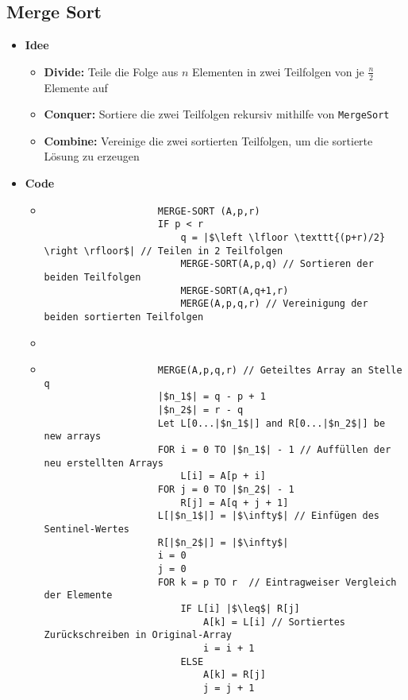 \subsection{Merge Sort} 
    \begin{itemize}
        \item \textbf{Idee} 
            \begin{itemize}
                \item \textbf{Divide:} Teile die Folge aus $n$ Elementen in zwei Teilfolgen von je $\frac{n}{2}$ Elemente auf
                \item \textbf{Conquer:} Sortiere die zwei Teilfolgen rekursiv mithilfe von \texttt{MergeSort}
                \item \textbf{Combine:} Vereinige die zwei sortierten Teilfolgen, um die sortierte Lösung zu erzeugen
            \end{itemize}
        \item \textbf{Code} 
            \begin{itemize}
                \item[]
                    \begin{verbatim}
                    MERGE-SORT (A,p,r)
                    IF p < r
                        q = |$\left \lfloor \texttt{(p+r)/2} \right \rfloor$| // Teilen in 2 Teilfolgen 
                        MERGE-SORT(A,p,q) // Sortieren der beiden Teilfolgen
                        MERGE-SORT(A,q+1,r)
                        MERGE(A,p,q,r) // Vereinigung der beiden sortierten Teilfolgen
                    \end{verbatim}
                \item[]
                \item[]
                    \begin{verbatim}
                    MERGE(A,p,q,r) // Geteiltes Array an Stelle q
                    |$n_1$| = q - p + 1
                    |$n_2$| = r - q 
                    Let L[0...|$n_1$|] and R[0...|$n_2$|] be new arrays 
                    FOR i = 0 TO |$n_1$| - 1 // Auffüllen der neu erstellten Arrays
                        L[i] = A[p + i]
                    FOR j = 0 TO |$n_2$| - 1
                        R[j] = A[q + j + 1]
                    L[|$n_1$|] = |$\infty$| // Einfügen des Sentinel-Wertes
                    R[|$n_2$|] = |$\infty$|
                    i = 0
                    j = 0
                    FOR k = p TO r  // Eintragweiser Vergleich der Elemente          
                        IF L[i] |$\leq$| R[j]
                            A[k] = L[i] // Sortiertes Zurückschreiben in Original-Array
                            i = i + 1
                        ELSE 
                            A[k] = R[j]
                            j = j + 1
                    \end{verbatim}
            \end{itemize}
        

\end{itemize}
